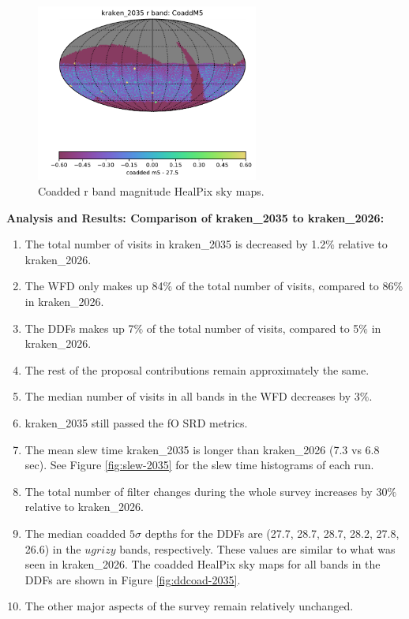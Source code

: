 \documentclass[DM,lsstdraft,authoryear,toc]{lsstdoc}
\begin{document}
\begin{figure}[ht]
\centering
\includegraphics[width=0.65\textwidth]{figures/kraken_2035_CoaddM5_r_band_HEAL_SkyMap.pdf} 
\caption{Coadded r band magnitude HealPix sky maps.}
\label{fig:rbandmap-2035}
\end{figure}

\textbf{Analysis and Results: Comparison of kraken\_2035 to kraken\_2026:}

\begin{enumerate}
\item The total number of visits in kraken\_2035 is decreased by 1.2$\%$ relative to kraken\_2026.
\item The WFD only makes up 84$\%$ of the total number of visits, compared to 86$\%$ in kraken\_2026.
\item The DDFs makes up 7$\%$ of the total number of visits, compared to 5$\%$ in kraken\_2026.
\item The rest of the proposal contributions remain approximately the same.
\item The median number of visits in all bands in the WFD decreases by 3$\%$.
\item kraken\_2035 still passed the fO SRD metrics.
\item The mean slew time kraken\_2035 is longer than kraken\_2026 (7.3 vs 6.8 sec). 
See Figure \autoref{fig:slew-2035} for the slew time histograms of each run.
\item The total number of filter changes during the whole survey increases by 30$\%$ relative to kraken\_2026.
\item The median coadded $5\sigma$ depths for the DDFs are (27.7, 28.7, 28.7, 28.2, 27.8, 26.6) in the $ugrizy$ bands, respectively.
These values are similar to what was seen in kraken\_2026. The coadded HealPix sky maps for all bands in the DDFs are shown in
 Figure \autoref{fig:ddcoad-2035}.
\item The other major aspects of the survey remain relatively unchanged.

\end{enumerate}
\end{document}
